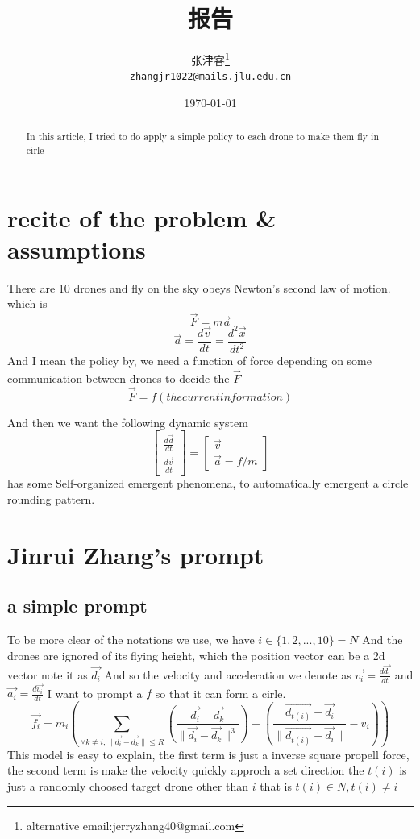 \documentclass{article}
\title{报告}
\author{
张津睿\thanks{alternative email:jerryzhang40@gmail.com} \\ \texttt{zhangjr1022@mails.jlu.edu.cn}
}
\date{\today}  %
\theoremstyle{definition} %
\begin{document}
\maketitle

\begin{abstract}
    In this article, I tried to do apply a
    simple policy to each drone to make
    them fly in cirle
\end{abstract}

\section{recite of the problem \& assumptions}
There are 10 drones and fly on the sky
obeys Newton's second law of motion.
which is
\[
    \vec{F} = m \vec{a}
\]
\[
    \vec{a} = \frac{d\vec{v}}{dt} = \frac{d^2 \vec{x}}{dt^2}
\]
And I mean the policy by, we need a function of force
depending on some communication between drones
to decide the \(\vec{F}\)
\[
    \vec{F}=f(the current information)
\]

And then we want the following dynamic system
\[\begin{bmatrix}
        \frac{d\vec{d}}{dt} \\
        \frac{d\vec{v}}{dt}
    \end{bmatrix}=
    \begin{bmatrix}
        \vec{v} \\
        \vec{a}=f/m
    \end{bmatrix}
\]
has some Self-organized emergent phenomena,
to automatically emergent a circle rounding pattern.

\section{Jinrui Zhang's prompt}
\subsection{a simple prompt}
\label{sec:asimpleprompt}
To be more clear of the notations we use,
we have \(i\in\{1,2,...,10\}=N\)
And the drones are ignored of its flying
height, which the position vector can be a
2d vector note it as \(\vec{d_i}\)
And so the velocity and acceleration we denote as
\(\vec{v_i}=\frac{d\vec{d_i}}{dt}\)
and
\(\vec{a_i}=\frac{d\vec{v_i}}{dt}\)
I want to prompt a \(f\) so that it can form
a cirle.
\[
    \vec{f_i}=m_i(\sum_{\forall k\neq i,\|\vec{d_i}-\vec{d_k}\|\leq R}(\frac{\vec{d_i}-\vec{d_k}}{\|\vec{d_i}-\vec{d_k}\|^3})+(\frac{\vec{d_{t(i)}}-\vec{d_i}}{\|\vec{d_{t(i)}}-\vec{d_i}\|}-v_i))
\]
This model is easy to explain, the first term is
just a inverse square propell force, the second
term is make the velocity quickly approch a set direction
the \(t(i)\) is just a randomly choosed target drone
other than \(i\) that is \(t(i)\in N, t(i)\neq i\)
\end{document}
